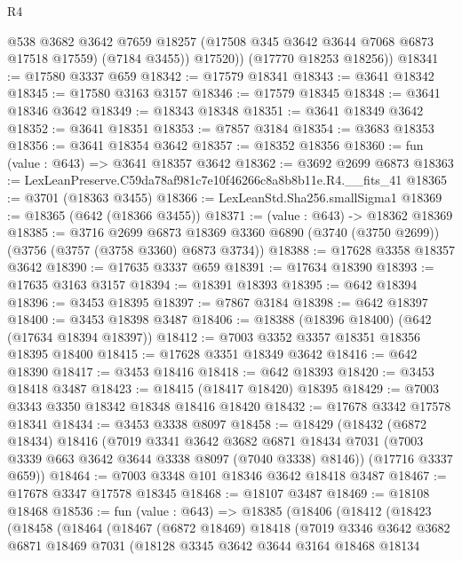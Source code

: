 \begin{lexlean}{R4}
\begin{coremodule}
            @538
            @3682
            @3642
            @7659
            @18257
            (@17508 @345 @3642 @3644 @7068 @6873 @17518 @17559)
            (@7184 @3455))
          @17520))
      (@17770 @18253 @18256))
@18341 := @17580 @3337 @659
@18342 := @17579 @18341
@18343 := @3641 @18342
@18345 := @17580 @3163 @3157
@18346 := @17579 @18345
@18348 := @3641 @18346 @3642
@18349 := @18343 @18348
@18351 := @3641 @18349 @3642
@18352 := @3641 @18351
@18353 := @7857 @3184
@18354 := @3683 @18353
@18356 := @3641 @18354 @3642
@18357 := @18352 @18356
@18360 := fun (value : @643) => @3641 @18357 @3642
@18362 := @3692 @2699 @6873
@18363 := LexLeanPreserve.C59da78af981c7e10f46266c8a8b8b11e.R4.__fits_41
@18365 := @3701 (@18363 @3455)
@18366 := LexLeanStd.Sha256.smallSigma1
@18369 := @18365 (@642 (@18366 @3455))
@18371 := (value : @643) -> @18362 @18369
@18385 := @3716
    @2699
    @6873
    @18369
    @3360
    @6890
    (@3740 (@3750 @2699))
    (@3756 (@3757 (@3758 @3360) @6873 @3734))
@18388 := @17628 @3358 @18357 @3642
@18390 := @17635 @3337 @659
@18391 := @17634 @18390
@18393 := @17635 @3163 @3157
@18394 := @18391 @18393
@18395 := @642 @18394
@18396 := @3453 @18395
@18397 := @7867 @3184
@18398 := @642 @18397
@18400 := @3453 @18398 @3487
@18406 := @18388 (@18396 @18400) (@642 (@17634 @18394 @18397))
@18412 := @7003 @3352 @3357 @18351 @18356 @18395 @18400
@18415 := @17628 @3351 @18349 @3642
@18416 := @642 @18390
@18417 := @3453 @18416
@18418 := @642 @18393
@18420 := @3453 @18418 @3487
@18423 := @18415 (@18417 @18420) @18395
@18429 := @7003 @3343 @3350 @18342 @18348 @18416 @18420
@18432 := @17678 @3342 @17578 @18341
@18434 := @3453 @3338 @8097
@18458 := @18429
    (@18432
      (@6872 @18434)
      @18416
      (@7019
        @3341
        @3642
        @3682
        @6871
        @18434
        @7031
        (@7003 @3339 @663 @3642 @3644 @3338 @8097 (@7040 @3338) @8146))
      (@17716 @3337 @659))
@18464 := @7003 @3348 @101 @18346 @3642 @18418 @3487
@18467 := @17678 @3347 @17578 @18345
@18468 := @18107 @3487
@18469 := @18108 @18468
@18536 := fun (value : @643) =>
  @18385
    (@18406
      (@18412
        (@18423
          (@18458
            (@18464
              (@18467
                (@6872 @18469)
                @18418
                (@7019
                  @3346
                  @3642
                  @3682
                  @6871
                  @18469
                  @7031
                  (@18128
                    @3345
                    @3642
                    @3644
                    @3164
                    @18468
                    @18134

\end{coremodule}
\end{lexlean}
